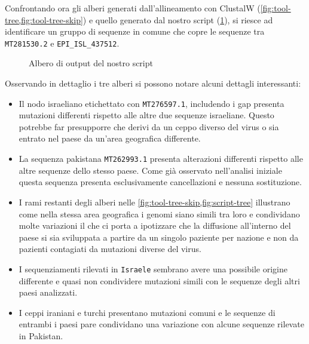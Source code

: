 \documentclass[11pt,italian]{article}
\begin{document}
\noindent
Confrontando ora gli alberi generati dall'allineamento con ClustalW (\cref{fig:tool-tree,fig:tool-tree-skip}) e quello generato dal nostro script (\cref{fig:script-tree}), si riesce ad identificare un gruppo di sequenze in comune che copre le sequenze tra \lstinline{MT281530.2} e \lstinline{EPI_ISL_437512}.

\begin{figure}[]
  \caption{Albero di output del nostro script}
  \label{fig:script-tree}
\end{figure}

\vspace{2mm}
\noindent
Osservando in dettaglio i tre alberi si possono notare alcuni dettagli interessanti:
\begin{itemize}
  \item Il nodo israeliano etichettato con \lstinline{MT276597.1}, includendo i gap presenta mutazioni differenti rispetto alle altre due sequenze israeliane. Questo potrebbe far presupporre che derivi da un ceppo diverso del virus o sia entrato nel paese da un'area geografica differente.
  \item La sequenza pakistana \lstinline{MT262993.1} presenta alterazioni differenti rispetto alle altre sequenze dello stesso paese. Come già osservato nell'analisi iniziale questa sequenza presenta esclusivamente cancellazioni e nessuna sostituzione.
  \item I rami restanti degli alberi nelle \cref{fig:tool-tree-skip,fig:script-tree} illustrano come nella stessa area geografica i genomi siano simili tra loro e condividano molte variazioni il che ci porta a ipotizzare che la diffusione all'interno del paese si sia sviluppata a partire da un singolo paziente per nazione e non da pazienti contagiati da mutazioni diverse del virus.
  \item I sequenziamenti rilevati in \lstinline{Israele} sembrano avere una possibile origine differente e quasi non condividere mutazioni simili con le sequenze degli altri paesi analizzati.
  \item I ceppi iraniani e turchi presentano mutazioni comuni e le sequenze di entrambi i paesi pare condividano una variazione con alcune sequenze rilevate in Pakistan.
\end{itemize}
\end{document}
